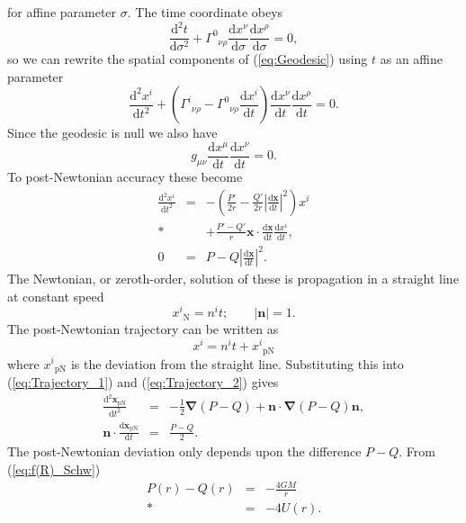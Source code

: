 \documentclass[aps,prd,amsfonts,amssymb,amsmath,nofootinbib,reprint,showpacs]{revtex4-1}
\newcommand{\eqnref}[1]{(\ref{eq:#1})}
\newcommand{\sub}[1]{\ensuremath{_\text{#1}}}
\newcommand{\dd}{\ensuremath{\text{d}}}
\newcommand{\diff}[2]{\ensuremath{\frac{\dd {#1}}{\dd {#2}}}}
\newcommand{\difftwo}[2]{\ensuremath{\frac{\dd^2 {#1}}{\dd {#2}^2}}}
\newcommand{\recip}[1]{\ensuremath{\frac{1}{#1}}}
\newcommand{\grad}{\ensuremath{\boldsymbol{\nabla}}}
\begin{document}
for affine parameter $\sigma$. The time coordinate obeys
\begin{equation}
\difftwo{t}{\sigma} + {\Gamma^0}_{\nu\rho}\diff{x^\nu}{\sigma}\diff{x^\rho}{\sigma} = 0,
\end{equation}
so we can rewrite the spatial components of \eqnref{Geodesic} using $t$ as an affine parameter~\cite{Will1993}
\begin{equation}
\difftwo{x^i}{t} + \left({\Gamma^i}_{\nu\rho} - {\Gamma^0}_{\nu\rho}\diff{x^i}{t}\right)\diff{x^\nu}{t}\diff{x^\rho}{t} = 0.
\end{equation}
Since the geodesic is null we also have
\begin{equation}
g_{\mu\nu}\diff{x^\mu}{t}\diff{x^\nu}{t} = 0.
\end{equation}
To post-Newtonian accuracy these become
\begin{eqnarray}
\label{eq:Trajectory_1}
\difftwo{x^i}{t} & = & -\left(\frac{P'}{2r} - \frac{Q'}{2r}\left|\diff{\boldsymbol{x}}{t}\right|^2\right)x^i \nonumber \\* 
 & & + {} \frac{P' - Q'}{r}\boldsymbol{x}\cdot\diff{\boldsymbol{x}}{t}\diff{x^i}{t}, \\
0 & = & P - Q\left|\diff{\boldsymbol{x}}{t}\right|^2.
\label{eq:Trajectory_2}
\end{eqnarray}
The Newtonian, or zeroth-order, solution of these is propagation in a straight line at constant speed~\cite{Will1993}
\begin{equation}
x^i\sub{N} = n^it; \qquad |\boldsymbol{n}| = 1.
\end{equation}
The post-Newtonian trajectory can be written as
\begin{equation}
x^i = n^it + x^i\sub{pN}
\end{equation}
where $x^i\sub{pN}$ is the deviation from the straight line. Substituting this into \eqnref{Trajectory_1} and \eqnref{Trajectory_2} gives
\begin{eqnarray}
\difftwo{\boldsymbol{x}\sub{pN}}{t} & = & -\recip{2}\grad(P - Q) + \boldsymbol{n}\cdot\grad(P - Q)\boldsymbol{n}, \\
\boldsymbol{n}\cdot\diff{\boldsymbol{x}\sub{pN}}{t} & = & \frac{P - Q}{2}.
\end{eqnarray}
The post-Newtonian deviation only depends upon the difference $P - Q$. From \eqnref{f(R)_Schw}
\begin{eqnarray}
P(r) - Q(r) & = & -\frac{4GM}{r} \nonumber \\*
 & = & -4U(r).
\end{eqnarray}
\end{document}
